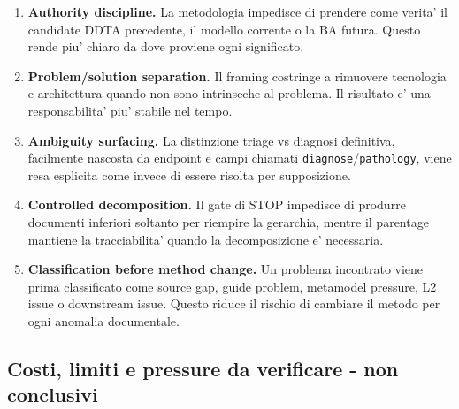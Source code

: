 \documentclass[11pt,a4paper]{article}
\begin{document}
\begin{enumerate}
  \item \textbf{Authority discipline.} La metodologia impedisce di prendere come verita' il candidate DDTA precedente, il modello corrente o la BA futura. Questo rende piu' chiaro da dove proviene ogni significato.
  \item \textbf{Problem/solution separation.} Il framing costringe a rimuovere tecnologia e architettura quando non sono intrinseche al problema. Il risultato e' una responsabilita' piu' stabile nel tempo.
  \item \textbf{Ambiguity surfacing.} La distinzione triage vs diagnosi definitiva, facilmente nascosta da endpoint e campi chiamati \texttt{diagnose}/\texttt{pathology}, viene resa esplicita come \NS{} invece di essere risolta per supposizione.
  \item \textbf{Controlled decomposition.} Il gate di STOP impedisce di produrre documenti inferiori soltanto per riempire la gerarchia, mentre il parentage mantiene la tracciabilita' quando la decomposizione e' necessaria.
  \item \textbf{Classification before method change.} Un problema incontrato viene prima classificato come source gap, guide problem, metamodel pressure, L2 issue o downstream issue. Questo riduce il rischio di cambiare il metodo per ogni anomalia documentale.
\end{enumerate}

\subsection{Costi, limiti e pressure da verificare - non conclusivi}
\end{document}
